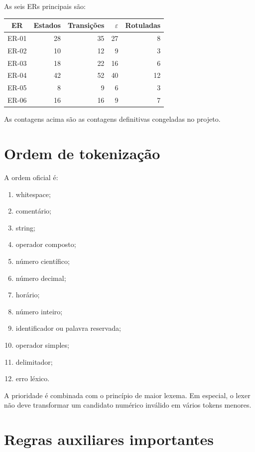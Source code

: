 \documentclass[12pt,a4paper,oneside]{report}
\begin{document}
As seis ERs principais são:

\begin{center}
\small
\begin{tabular}{|c|r|r|r|r|}
\toprule
ER & Estados & Transições & $\varepsilon$ & Rotuladas \\
\midrule
ER-01 & 28 & 35 & 27 & 8 \\
ER-02 & 10 & 12 & 9 & 3 \\
ER-03 & 18 & 22 & 16 & 6 \\
ER-04 & 42 & 52 & 40 & 12 \\
ER-05 & 8 & 9 & 6 & 3 \\
ER-06 & 16 & 16 & 9 & 7 \\
\bottomrule
\end{tabular}
\end{center}

As contagens acima são as contagens definitivas congeladas no projeto.

\section{Ordem de tokenização}

A ordem oficial é:

\begin{enumerate}
    \item whitespace;
    \item comentário;
    \item string;
    \item operador composto;
    \item número científico;
    \item número decimal;
    \item horário;
    \item número inteiro;
    \item identificador ou palavra reservada;
    \item operador simples;
    \item delimitador;
    \item erro léxico.
\end{enumerate}

A prioridade é combinada com o princípio de maior lexema. Em especial, o lexer não deve transformar um candidato numérico inválido em vários tokens menores.

\section{Regras auxiliares importantes}
\end{document}
